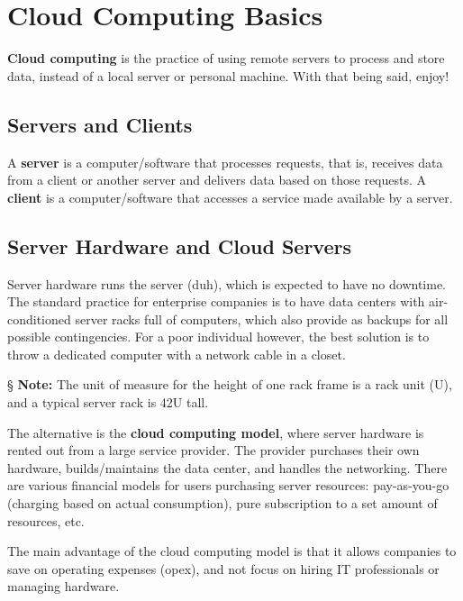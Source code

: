\documentclass{report}
\newcommand{\npar}{\par\noindent}
\newcommand{\vpar}{\vspace{1em}\npar}
\newcommand{\note}{\vpar \S \textbf{ Note: }}
\begin{document}
\tableofcontents{}

\chapter{Cloud Computing Basics}

\textbf{Cloud computing} is the practice of using remote servers to process and store data, instead of a local server or personal machine. With that being said, enjoy!

\section{Servers and Clients}

\par A \textbf{server} is a computer/software that processes requests, that is, receives data from a client or another server and delivers data based on those requests. A \textbf{client} is a computer/software that accesses a service made available by a server.

\section{Server Hardware and Cloud Servers}

\par Server hardware runs the server (duh), which is expected to have no downtime. The standard practice for enterprise companies is to have data centers with air-conditioned server racks full of computers, which also provide as backups for all possible contingencies. For a poor individual however, the best solution is to throw a dedicated computer with a network cable in a closet.

\note The unit of measure for the height of one rack frame is a rack unit (U), and a typical server rack is 42U tall.

\vpar The alternative is the \textbf{cloud computing model}, where server hardware is rented out from a large service provider. The provider purchases their own hardware, builds/maintains the data center, and handles the networking. There are various financial models for users purchasing server resources: pay-as-you-go (charging based on actual consumption), pure subscription to a set amount of resources, etc.

\vpar The main advantage of the cloud computing model is that it allows companies to save on operating expenses (opex), and not focus on hiring IT professionals or managing hardware.
\end{document}
